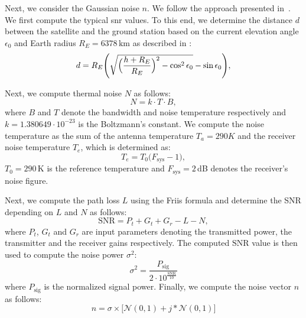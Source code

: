 \documentclass[conference]{IEEEtran}
\begin{document}


Next, we consider the Gaussian noise $n$. We follow the approach presented in~\cite{satjscc}. 
We first compute the typical \ac{snr} values. 
To this end, we determine the distance $d$ between the satellite and the ground station based on the current elevation angle $\epsilon_0$ and Earth radius $R_E = 6378\,\textrm{km}$ as described in \cite{7506756}:
%
\begin{equation}
  d = R_E\Biggl(\sqrt{\Bigl(\frac{h + R_E}{R_E}\Bigr)^2 - \cos^{2}\epsilon_{0}} - \sin\epsilon_{0}\Biggr),
\end{equation}
%

Next, we compute thermal noise $N$ as follows:
%
\begin{equation}
  N=k \cdot T \cdot B,
\end{equation}
%
where $B$ and $T$ denote the bandwidth and noise temperature respectively and $k = 1.380649 \cdot 10^{-23}$ is the Boltzmann's constant.
We compute the noise temperature as the sum of the antenna temperature $T_a = 290 K$ and the receiver noise temperature $T_e$, which is determined as:
%
\begin{equation}
  T_e = T_0 \big(F_{\mathrm{sys}} - 1 \big),
\end{equation}
%
$T_0 = 290$\,K is the reference temperature and $F_{\textrm{sys}} = 2$\,dB denotes the receiver's noise figure.

Next, we compute the path loss $L$ using the Friis formula and determine the SNR depending on $L$ and $N$ as follows:
%
\begin{equation}
  \mathrm{SNR} = P_t + G_t + G_r - L - N,
\end{equation}
%
where $P_t$, $G_t$ and $G_r$ are input parameters denoting the transmitted power, the transmitter and the receiver gains respectively. 
The computed $\mathrm{SNR}$ value is then used to compute the noise power $\sigma^2$:
%
\begin{equation}
  \sigma^2 = \frac{P_{\mathrm{sig}}}{2 \cdot 10^{\frac{\mathrm{SNR}}{10}}}
\end{equation}
%
where $P_{\mathrm{sig}}$ is the normalized signal power.
Finally, we compute the noise vector $n$ as follows:
%
\begin{equation}
  n = \sigma \times \bigl[\mathcal{N}(0,1) + j * \mathcal{N}(0,1) \bigr] 
\end{equation}
%
\end{document}
